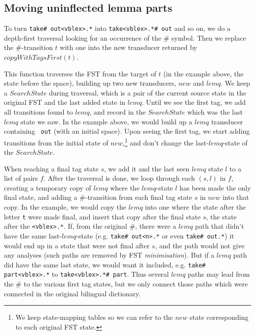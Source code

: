 \documentclass[10pt, a4paper]{article}
\newcommand{\ana}[1]{\texttt{#1}}
\begin{document}
\subsection{Moving uninflected lemma parts}
\label{sec:lemqmove}

To turn \ana{take\# out<vblex>.*} into \ana{take<vblex>.*\# out} and
so on, we do a depth-first traversal looking for an occurrence of the
\# symbol. Then we replace the \#-transition $t$ with one into the new
transducer returned by $copyWithTagsFirst(t)$. 

This function traverses the FST from the target of $t$ (in the example
above, the state before the space), building up two new transducers,
$new$ and $lemq$. We keep a $SearchState$ during traversal, which is a
pair of the current source state in the original FST and the last
added state in $lemq$. Until we see the first tag, we add all
transitions found to $lemq$, and record in the $SearchState$ which was
the last $lemq$ state we saw. In the example above, we would build up
a $lemq$ transducer containing \ana{ out} (with an initial space).
Upon seeing the first tag, we start adding transitions from the
initial state of $new$,\footnote{We keep state-mapping tables so we
can refer to the $new$ state corresponding to each original FST
state.} and don't change the last-$lemq$-state of the $SearchState$.

When reaching a final tag state $s$, we add it and the last seen
$lemq$ state $l$ to a list of pairs $f$. After the traversal is done,
we loop through each $(s,l)$ in $f$, creating a temporary copy of
$lemq$ where the $lemq$-state $l$ has been made the only final state,
and adding a \#-transition from each final tag state $s$ in $new$ into
that copy. In the example, we would copy the $lemq$ into one where the
state after the letter \ana{t} were made final, and insert that copy
after the final state $s$, the state after the \ana{<vblex>.*}. If,
from the original \#, there were a $lemq$ path that didn't have the
same last-$lemq$-state (e.g. \ana{take\# out<n>.*} or even \ana{take\#
out.*}) it would end up in a state that were not final after $s$, and
the path would not give any analyses (such paths are removed by FST
\emph{minimisation}). But if a $lemq$ path did have the same last
state, we would want it included, e.g. \ana{take\# part<vblex>.*} to
\ana{take<vblex>.*\# part}. Thus several $lemq$ paths may lead from
the \# to the various first tag states, but we only connect those
paths which were connected in the original bilingual dictionary.
\end{document}
